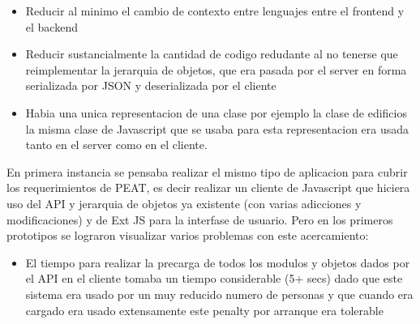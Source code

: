 \documentclass{article}
\begin{document}
\begin{itemize}
  \item Reducir al minimo el cambio de contexto entre lenguajes entre
    el frontend y el backend
  \item Reducir sustancialmente la cantidad de codigo redudante al no
    tenerse que reimplementar la jerarquia de objetos, que era pasada
    por el server en forma serializada por JSON y deserializada por el
    cliente
  \item Habia una unica representacion de una clase por ejemplo la
    clase de edificios la misma clase de Javascript que se usaba para
    esta representacion era usada tanto en el server como en el
    cliente.
\end{itemize}

En primera instancia se pensaba realizar el mismo tipo de aplicacion
para cubrir los requerimientos de PEAT, es decir realizar un cliente
de Javascript que hiciera uso del API y jerarquia de objetos ya
existente (con varias adicciones y modificaciones) y de Ext JS
para la interfase de usuario. Pero en los primeros prototipos se
lograron visualizar varios problemas con este acercamiento:
\begin{itemize}
  \item El tiempo para realizar la precarga de todos los modulos y
    objetos dados por el API en el cliente tomaba un tiempo
    considerable (5+ secs) dado que este sistema era usado por un muy
    reducido numero de personas y que cuando era cargado era usado
    extensamente este penalty por arranque era tolerable
\end{itemize}
\end{document}
